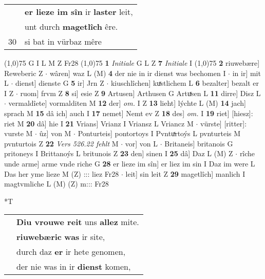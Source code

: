 \documentclass[8pt,a4paper,notitlepage]{article}
\begin{document}
\begin{table}[ht]
\begin{minipage}[t]{0.5\linewidth}
\begin{tabular}{rl}
 & \textbf{er lieze im sîn} ir \textbf{laster} leit,\\ 
 & unt durch \textbf{magetlîch} êre.\\ 
30 & si bat in vürbaz mêre\\ 
\end{tabular}
\scriptsize
\line(1,0){75} \newline
G I L M Z Fr28 \newline
\line(1,0){75} \newline
\textbf{1} \textit{Initiale} G L Z  \textbf{7} \textit{Initiale} I  \newline
\line(1,0){75} \newline
\textbf{2} riuwebære] Reweberic Z  $\cdot$ wâren] waz L (M) \textbf{4} der nie in ir dienst was bechomen I  $\cdot$ in ir] mit L  $\cdot$ dienst] dienste G \textbf{5} ir] Jrn Z  $\cdot$ kiuschlîchen] kuͯstlichem L \textbf{6} bezalter] bezalt er I Z  $\cdot$ ruom] frvm Z \textbf{8} si] esie Z \textbf{9} Artusen] Arthusen G Artuͯsen L \textbf{11} dirre] Disz L  $\cdot$ vermaldîete] vormalditen M \textbf{12} der] \textit{om.} I Z \textbf{13} lieht] lýchte L (M) \textbf{14} jach] sprach M \textbf{15} dâ ich] auch I \textbf{17} nemet] Nemt ev Z \textbf{18} des] \textit{om.} I \textbf{19} riet] [hiesz]: riet M \textbf{20} dâ] hie I \textbf{21} Vrians] Vrianz I Vriansz L Vriancz M  $\cdot$ vürste] [ritter]: vurste M  $\cdot$ ûz] von M  $\cdot$ Ponturteis] pontortoys I Pvntuͯrtoýs L pvnturteis M pvnturtois Z \textbf{22} \textit{Vers 526.22 fehlt} M   $\cdot$ vor] von L  $\cdot$ Britaneis] britanois G pritoneys I Brittanoýs L britunois Z \textbf{23} den] sinen I \textbf{25} dâ] Daz L (M) Z  $\cdot$ rîche unde arme] arme vnde riche G \textbf{28} er lieze im sîn] er liez im sin I Daz im were L Das her yme lieze M (Z) ::: liez Fr28  $\cdot$ leit] sin leit Z \textbf{29} magetlîch] manlich I magtvmliche L (M) (Z) m::: Fr28 \newline
\end{minipage}
\hspace{0.5cm}
\begin{minipage}[t]{0.5\linewidth}
\small
\begin{center}*T
\end{center}
\begin{tabular}{rl}
 & \textbf{Diu vrouwe reit} uns \textbf{allez} mite.\\ 
 & \textbf{riuwebæric} \textbf{was} ir site,\\ 
 & durch daz \textbf{er} ir hete genomen,\\ 
 & der nie was in ir \textbf{dienst} komen,\\ 

\end{tabular}
\end{minipage}
\end{table}
\end{document}
